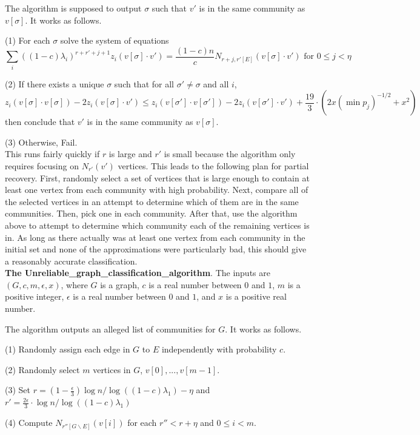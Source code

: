 \documentclass[11pt]{article}
\newcommand{\1}{\mathbb{1}}
\begin{document}
The algorithm is supposed to output $\sigma$ such that $v'$ is in the same community as $v[\sigma]$. It works as follows. 

(1) For each $\sigma$ solve the system of equations  \[\sum_i ((1-c)\lambda_i)^{r+r'+j+1}z_i(v[\sigma]\cdot v')=\frac{(1-c)n}{c}N_{r+j,r'[E]}(v[\sigma]\cdot v') \text{ for } 0\le j<\eta\]

(2) If there exists a unique $\sigma$ such that for all $\sigma'\ne \sigma$ and all $i$, \[z_i(v[\sigma]\cdot v[\sigma])-2z_i(v[\sigma]\cdot v')\le z_i(v[\sigma']\cdot v[\sigma'])-2z_i(v[\sigma']\cdot v') +\frac{19}{3}\cdot (2x(\min p_j)^{-1/2}+x^2)\] then conclude that $v'$ is in the same community as $v[\sigma]$.

(3) Otherwise, Fail.\\

This runs fairly quickly if $r$ is large and $r'$ is small because the algorithm only requires focusing on $N_{r'}(v')$ vertices. This leads to the following plan for partial recovery. First, randomly select a set of vertices that is large enough to contain at least one vertex from each community with high probability. Next, compare all of the selected vertices in an attempt to determine which of them are in the same communities. Then, pick one in each community. After that, use the algorithm above to attempt to determine which community each of the remaining vertices is in. As long as there actually was at least one vertex from each community in the initial set and none of the approximations were particularly bad, this should give a reasonably accurate classification. \\

\noindent
{\bf The Unreliable\_graph\_classification\_algorithm}. The inputs are $(G,c,m,\epsilon,x)$, where $G$ is a graph, $c$ is a real number between $0$ and $1$, $m$ is a positive integer, $\epsilon$ is a real number between $0$ and $1$, and $x$ is a positive real number. 

The algorithm outputs an alleged list of communities for $G$. It works as follows.

(1) Randomly assign each edge in $G$ to $E$ independently with probability $c$.

(2) Randomly select $m$ vertices in $G$, $v[0],...,v[m-1]$.

(3) Set $r=(1-\frac{\epsilon}{3})\log n/\log ((1-c)\lambda_1)-\eta$ and $r'=\frac{2\epsilon}{3}\cdot \log n/\log((1-c) \lambda_1)$

(4) Compute $N_{r''[G\backslash E]}(v[i])$ for each $r''<r+\eta$ and $0\le i<m$.
\end{document}
